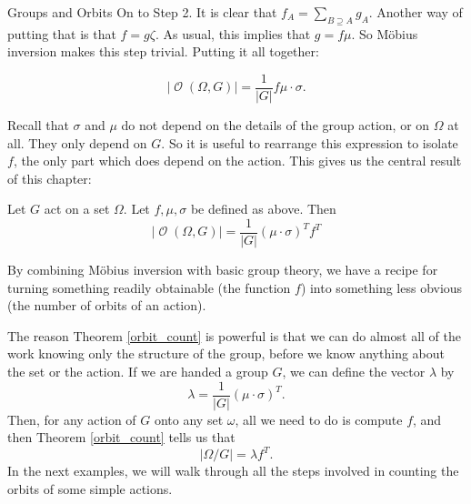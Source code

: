 \documentclass[12pt]{pom_thesis}
\DeclareMathOperator{\orb}{\mathcal{O}}
\begin{document}
\begin{chapter}{Groups and Orbits}
On to Step 2. It is clear that $f_A = \sum_{B \supseteq A} g_A$. Another way of putting that is that $f = g\zeta$. As usual, this implies that $g = f\mu$. So M\"obius inversion makes this step trivial. Putting it all together:

\[|\orb(\Omega, G)| = \frac {1}{|G|}f\mu \cdot \sigma.\]

Recall that $\sigma$ and $\mu$ do not depend on the details of the group action, or on $\Omega$ at all. They only depend on $G$. So it is useful to rearrange this expression to isolate $f$, the only part which does depend on the action. This gives us the central result of this chapter:
\begin{thm}\label{orbit_count}
Let $G$ act on a set $\Omega$. Let $f, \mu, \sigma$ be defined as above. Then
\[
|\orb(\Omega, G)| = \frac {1}{|G|}(\mu \cdot \sigma)^Tf^T
\]
\end{thm}

By combining M\"obius inversion with basic group theory, we have a recipe for turning something readily obtainable (the function $f$) into something less obvious (the number of orbits of an action).

The reason Theorem \ref{orbit_count} is powerful is that we can do almost all of the work knowing only the structure of the group, before we know anything about the set or the action. If we are handed a group $G$, we can define the vector $\lambda$ by
\begin{equation}\label{eq:lambda}
\lambda = \frac {1}{|G|}(\mu \cdot \sigma)^T.
\end{equation}
Then, for any action of $G$ onto any set $\omega$, all we need to do is compute $f$, and then Theorem \ref{orbit_count} tells us that
\[
|\Omega/G| = \lambda f^T.
\]
In the next examples, we will walk through all the steps involved in counting the orbits of some simple actions.


\end{chapter}
\end{document}
